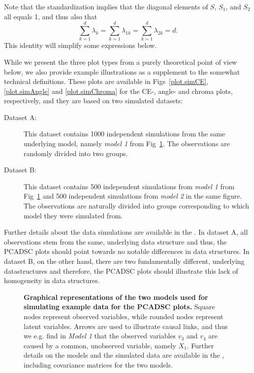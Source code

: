 \documentclass[a4paper,14pt]{article}
\begin{document}
Note that the standardization implies that the diagonal elements of $S$, $S_1$, and $S_2$ all equals 1, and thus also that
\begin{equation*}
\sum_{k=1}^d \lambda_k = \sum_{k=1}^d \lambda_{1k} = \sum_{k=1}^d \lambda_{2k} =  d.
\end{equation*}
This identity will simplify some expressions below.

While we present the three plot types from a purely theoretical point of view below, we also provide example illustrations as a supplement to the somewhat technical definitions. These plots are available in Figs~\ref{plot.simCE}, \ref{plot.simAngle} and \ref{plot.simChroma} for the CE-, angle- and chroma plots, respectively, and they are based on two simulated datasets:
\begin{description}
\item[Dataset A:] This dataset contains 1000 independent simulations from the same underlying model, namely \textit{model 1} from Fig~\ref{fig.simGraphs}. The observations are randomly divided into two groups.
\item[Dataset B:] This dataset contains 500 independent simulations from \textit{model 1} from Fig~\ref{fig.simGraphs} and 500 independent simulations from \textit{model 2} in the same figure. The observations are naturally divided into groups corresponding to which model they were simulated from.
\end{description}
Further details about the data simulations are available in the . In dataset A, all observations stem from the same, underlying data structure and thus, the PCADSC plots should point towards no notable differences in data structures. In dataset B, on the other hand, there are two fundamentally different, underlying datastructures and therefore, the PCADSC plots should illustrate this lack of homogeneity in data structures.

\begin{figure}[!h]
\caption{{\bf Graphical representations of the two models used for simulating example data for the PCADSC plots.} Square nodes represent observed variables, while rounded nodes represent latent variables.  Arrows are used to illustrate causal links, and thus we e.g. find in \textit{Model 1} that the observed variables $v_3$ and $v_4$ are caused by a common, unobserved variable, namely $X_1$. Further details on the models and the simulated data are available in the , including covariance matrices for the two models.}
\label{fig.simGraphs}
\end{figure}
\end{document}
